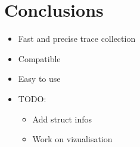 \section{Conclusions}
\label{sec:cncl}

\begin{itemize}
    \item Fast and precise trace collection
    \item Compatible
    \item Easy to use
    \item TODO:
        \begin{itemize}
            \item Add struct infos
            \item Work on vizualisation
        \end{itemize}
\end{itemize}
